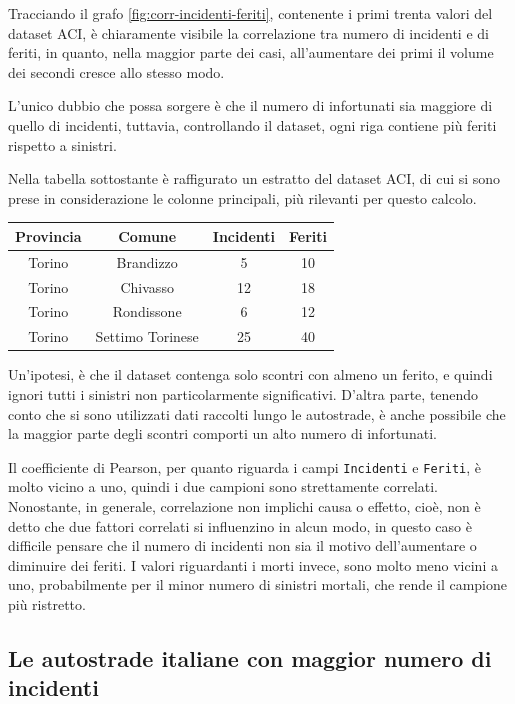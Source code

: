 \documentclass[a4paper,12pt]{report}
\newcommand{\columnstyle}[1]{\texttt{#1}}
\begin{document}
Tracciando il grafo \ref{fig:corr-incidenti-feriti}, contenente i primi trenta valori 
del dataset ACI, è chiaramente visibile la correlazione tra 
numero di incidenti e di feriti, in quanto, nella maggior parte dei casi, 
all'aumentare dei primi il volume dei secondi cresce allo stesso modo. 

L'unico dubbio che possa sorgere è che il numero di infortunati sia maggiore di quello 
di incidenti, tuttavia, controllando il dataset, ogni 
riga contiene più feriti rispetto a sinistri. 

Nella tabella sottostante è raffigurato un estratto del dataset ACI, 
di cui si sono prese in considerazione le colonne principali, più 
rilevanti per questo calcolo. 

\begin{center}
    \def\arraystretch{1.5}%
    \begin{tabular}{ |c|c|c|c| } 
    \hline
    Provincia & Comune & Incidenti & Feriti \\ 
    \hline
    \rowcolor{TableGray}
    Torino & Brandizzo & 5 & 10\\
    Torino & Chivasso & 12 & 18\\
    \rowcolor{TableGray}
    Torino & Rondissone & 6 & 12\\
    Torino & Settimo Torinese & 25 & 40\\
    \hline
    \end{tabular}
\end{center}

Un'ipotesi, è che il dataset contenga solo scontri con almeno un ferito, 
e quindi ignori tutti i sinistri non particolarmente significativi. 
D'altra parte, tenendo conto che si sono utilizzati dati raccolti lungo 
le autostrade, è anche possibile che la maggior parte degli scontri comporti 
un alto numero di infortunati. 

Il coefficiente di Pearson, per quanto riguarda i campi \columnstyle{Incidenti} 
e \columnstyle{Feriti}, 
è molto vicino a uno, quindi i due campioni sono strettamente correlati. 
Nonostante, in generale, correlazione non implichi causa o effetto, cioè, non 
è detto che due fattori correlati si influenzino in alcun modo, in questo caso è 
difficile pensare che il numero di incidenti non sia il motivo dell'aumentare o diminuire 
dei feriti. 
I valori riguardanti i morti invece, sono molto meno vicini a uno, probabilmente 
per il minor numero di sinistri mortali, che rende il campione più ristretto. 

\subsection{Le autostrade italiane con maggior numero di incidenti}
\end{document}
